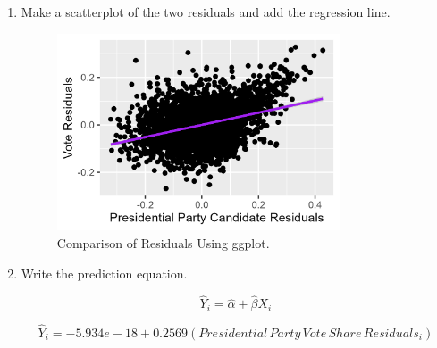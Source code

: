 \documentclass[12pt,letterpaper]{article}
\begin{document}
\begin{enumerate}
		\item Make a scatterplot of the two residuals and add the regression line.
		
	  
			
	\begin{figure}[h!]
	\centering
	\caption{\footnotesize Comparison of Residuals Using ggplot.}
	\includegraphics[width=0.79\textwidth]{residuals_scatter.png}
	
\end{figure} 
		 
		\item Write the prediction equation.
		
		{\large 			$$\hat{Y}_i = \hat{\alpha} +  \hat{\beta}X_i $$}
		
		
		{ 			$$\hat{Y}_i =  {-5.934e-18} +  0.2569(Presidential\,Party\,Vote\,Share\, Residuals_i) $$} \\
		
	\end{enumerate}
	
	\newpage	
\end{document}
